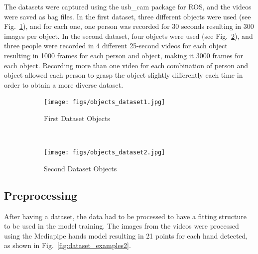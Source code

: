 The datasets were captured using the usb\_cam package for ROS, and the videos were saved as bag files. In the first dataset, three different objects were used (see Fig.~\ref{fig:objects_dataset1}), and for each one, one person was recorded for 30 seconds resulting in 300 images per object. In the second dataset, four objects were used (see Fig.~\ref{fig:objects_dataset2}), and three people were recorded in 4 different 25-second videos for each object resulting in 1000 frames for each person and object, making it 3000 frames for each object. Recording more than one video for each combination of person and object allowed each person to grasp the object slightly differently each time in order to obtain a more diverse dataset.

\begin{figure}[H]
    \centering
    \begin{subfigure}[b]{0.49\textwidth}
        \texttt{[image: figs/objects\_dataset1.jpg]}
        \caption{First Dataset Objects}
        \label{fig:objects_dataset1}
    \end{subfigure} \
    \begin{subfigure}[b]{0.49\textwidth}
        \texttt{[image: figs/objects\_dataset2.jpg]}
        \caption{Second Dataset Objects}
        \label{fig:objects_dataset2}
    \end{subfigure}
    \caption[Dataset Objects]{}
    \label{fig:dataset_objects}
\end{figure}

\subsection{Preprocessing}

After having a dataset, the data had to be processed to have a fitting structure to be used in the model training. The images from the videos were processed using the Mediapipe hands model resulting in 21 points for each hand detected, as shown in Fig.~\ref{fig:dataset_examples2}.

